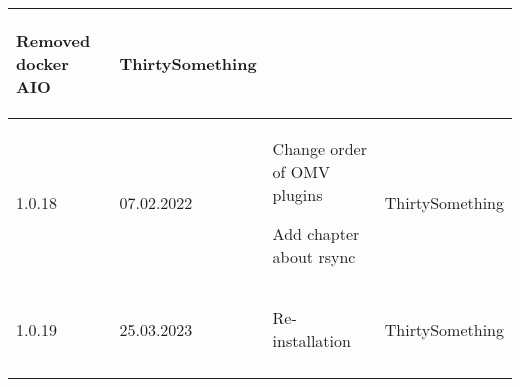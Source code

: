 \begin{tiny}
\begin{longtable}{ | p{} | p{} | P{0.49\textwidth} | p{0.15\textwidth} | }
\begin{tsLTItemize}
            \item Removed docker AIO
        \end{tsLTItemize}
                                 &
        ThirtySomething            \\
        \hline
        1.0.18                   &
        07.02.2022               &
        \begin{tsLTItemize}
            \item Change order of OMV plugins
            \item Add chapter about rsync
        \end{tsLTItemize}
                                 &
        ThirtySomething            \\
        \hline
        1.0.19                   &
        25.03.2023               &
        \begin{tsLTItemize}
            \item Re-installation
        \end{tsLTItemize}
                                 &
        ThirtySomething            \\
        \hline
    \end{longtable}
\end{tiny}
